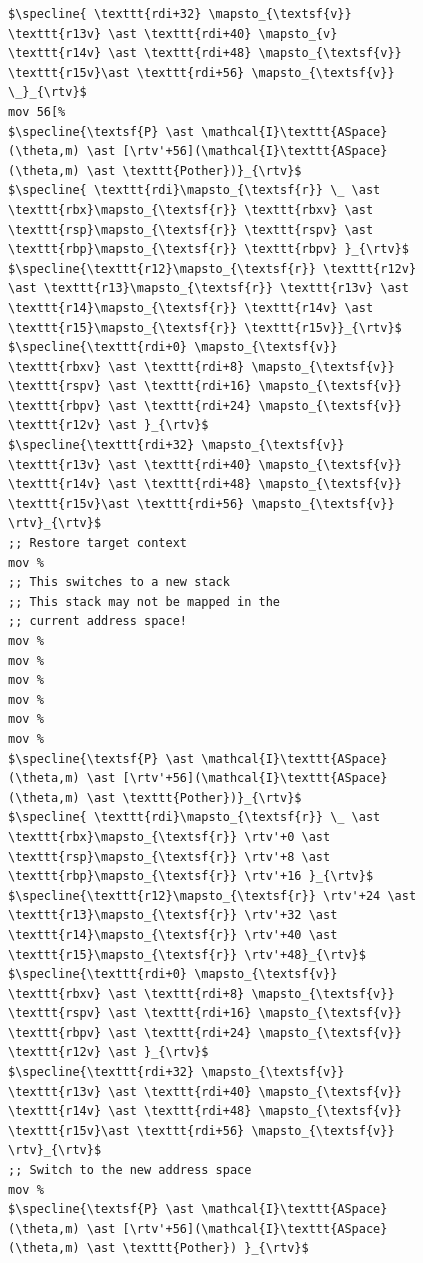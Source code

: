 \documentclass[acmsmall,screen,nonacm]{acmart}
\begin{document}
\begin{figure}
\begin{lstlisting}
$\specline{ \texttt{rdi+32} \mapsto_{\textsf{v}} \texttt{r13v} \ast \texttt{rdi+40} \mapsto_{v} \texttt{r14v} \ast \texttt{rdi+48} \mapsto_{\textsf{v}} \texttt{r15v}\ast \texttt{rdi+56} \mapsto_{\textsf{v}} \_}_{\rtv}$
mov 56[%
$\specline{\textsf{P} \ast \mathcal{I}\texttt{ASpace}(\theta,m) \ast [\rtv'+56](\mathcal{I}\texttt{ASpace}(\theta,m) \ast \texttt{Pother})}_{\rtv}$
$\specline{ \texttt{rdi}\mapsto_{\textsf{r}} \_ \ast \texttt{rbx}\mapsto_{\textsf{r}} \texttt{rbxv} \ast  \texttt{rsp}\mapsto_{\textsf{r}} \texttt{rspv} \ast \texttt{rbp}\mapsto_{\textsf{r}} \texttt{rbpv} }_{\rtv}$
$\specline{\texttt{r12}\mapsto_{\textsf{r}} \texttt{r12v} \ast \texttt{r13}\mapsto_{\textsf{r}} \texttt{r13v} \ast \texttt{r14}\mapsto_{\textsf{r}} \texttt{r14v} \ast \texttt{r15}\mapsto_{\textsf{r}} \texttt{r15v}}_{\rtv}$
$\specline{\texttt{rdi+0} \mapsto_{\textsf{v}} \texttt{rbxv} \ast \texttt{rdi+8} \mapsto_{\textsf{v}} \texttt{rspv} \ast \texttt{rdi+16} \mapsto_{\textsf{v}} \texttt{rbpv} \ast \texttt{rdi+24} \mapsto_{\textsf{v}} \texttt{r12v} \ast }_{\rtv}$
$\specline{\texttt{rdi+32} \mapsto_{\textsf{v}} \texttt{r13v} \ast \texttt{rdi+40} \mapsto_{\textsf{v}} \texttt{r14v} \ast \texttt{rdi+48} \mapsto_{\textsf{v}} \texttt{r15v}\ast \texttt{rdi+56} \mapsto_{\textsf{v}} \rtv}_{\rtv}$    
;; Restore target context
mov %
;; This switches to a new stack
;; This stack may not be mapped in the
;; current address space!
mov %
mov %
mov %
mov %
mov %
mov %
$\specline{\textsf{P} \ast \mathcal{I}\texttt{ASpace}(\theta,m) \ast [\rtv'+56](\mathcal{I}\texttt{ASpace}(\theta,m) \ast \texttt{Pother})}_{\rtv}$
$\specline{ \texttt{rdi}\mapsto_{\textsf{r}} \_ \ast \texttt{rbx}\mapsto_{\textsf{r}} \rtv'+0 \ast  \texttt{rsp}\mapsto_{\textsf{r}} \rtv'+8 \ast \texttt{rbp}\mapsto_{\textsf{r}} \rtv'+16 }_{\rtv}$
$\specline{\texttt{r12}\mapsto_{\textsf{r}} \rtv'+24 \ast \texttt{r13}\mapsto_{\textsf{r}} \rtv'+32 \ast \texttt{r14}\mapsto_{\textsf{r}} \rtv'+40 \ast \texttt{r15}\mapsto_{\textsf{r}} \rtv'+48}_{\rtv}$
$\specline{\texttt{rdi+0} \mapsto_{\textsf{v}} \texttt{rbxv} \ast \texttt{rdi+8} \mapsto_{\textsf{v}} \texttt{rspv} \ast \texttt{rdi+16} \mapsto_{\textsf{v}} \texttt{rbpv} \ast \texttt{rdi+24} \mapsto_{\textsf{v}} \texttt{r12v} \ast }_{\rtv}$
$\specline{\texttt{rdi+32} \mapsto_{\textsf{v}} \texttt{r13v} \ast \texttt{rdi+40} \mapsto_{\textsf{v}} \texttt{r14v} \ast \texttt{rdi+48} \mapsto_{\textsf{v}} \texttt{r15v}\ast \texttt{rdi+56} \mapsto_{\textsf{v}} \rtv}_{\rtv}$
;; Switch to the new address space
mov %
$\specline{\textsf{P} \ast \mathcal{I}\texttt{ASpace}(\theta,m) \ast [\rtv'+56](\mathcal{I}\texttt{ASpace}(\theta,m) \ast \texttt{Pother}) }_{\rtv}$

\end{lstlisting}
\end{figure}
\end{document}
